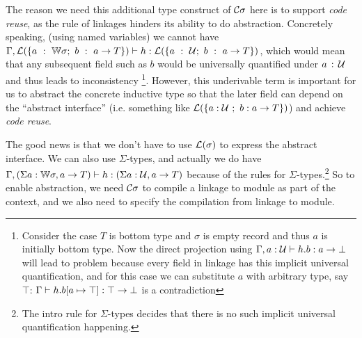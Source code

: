 The reason we need this additional type construct of ${\mathcal{C}}\sigma$ here is
to support \textit{code reuse}, as the rule of linkages hinders its
ability to do abstraction. Concretely speaking, (using named variables)
we cannot have ${ {\Gamma, {\mathcal{L}}(\{a~:~{\mathbb{W}} \sigma;~b~:~a \to
T\})} \vdash {h} : {{\mathcal{L}}(\{a~:~{\mathcal{U}};~b~:~a \to T\})} }$, which would mean that any
subsequent field such as $b$ would be universally quantified under
$a\,:\,{\mathcal{U}}$ and thus leads to inconsistency
\footnote{%
Consider the case $T$ is bottom type and $\sigma$ is empty record and
thus $a$ is initially bottom type. Now the direct projection using
 ${ {\Gamma, a : {\mathcal{U}}} \vdash {h.b} : {a \to \bot} }$ will
lead to problem because every field in linkage has this implicit
universal quantification, and for this case we can substitute $a$ with
arbitrary type, say $\top$: ${ {\Gamma} \vdash {h.b[a \mapsto \top]} : {\top
\to \bot} }$ is a contradiction}.
However, this underivable term is important for us to abstract the
concrete inductive type so that the later field can depend on the
``abstract interface'' (i.e. something like ${\mathcal{L}}(\{a:{\mathcal{U}}~;~b:a \to T\})$) and achieve \textit{code reuse}. 

The good news is that we don't have to use ${\mathcal{L}}(\sigma)$ to
express the abstract interface. We can also use $\Sigma$-types, and actually
we do have ${ {\Gamma, (\Sigma a : {\mathbb{W}}\sigma, a \to T)
} \vdash {h} : {(\Sigma a : {\mathcal{U}}, a \to T)} }$ because of the rules for
$\Sigma$-types.\footnote{The intro rule for $\Sigma$-types decides that
there is no such implicit universal quantification happening.}
So to enable abstraction, we need ${\mathcal{C}}\sigma$ to compile a
linkage to module as part of the context, and we also need
 to specify the compilation from linkage to
module.


